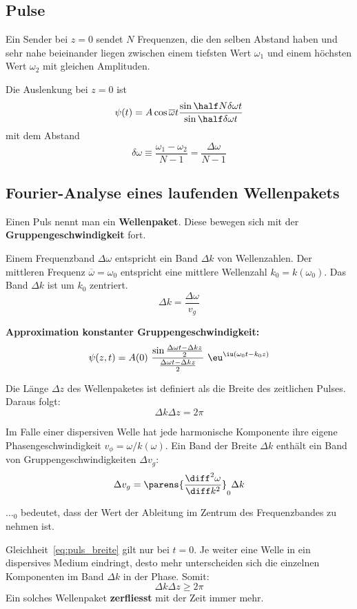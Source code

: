	\subsection{Pulse} %
		Ein Sender bei $z=0$ sendet $N$ Frequenzen, die den selben Abstand haben und sehr nahe beieinander liegen zwischen einem tiefsten Wert $\omega_1$ und einem höchsten Wert $\omega_2$ mit gleichen Amplituden.
		
		Die Auslenkung bei $z=0$ ist
		\[
			\psi(t) = A \cos \overline\omega t \frac{\sin \half N\delta \omega t}{\sin \half \delta \omega t}
		\]
		mit dem Abstand
		\[
			\delta \omega \equiv \frac{\omega_1 - \omega_2}{N-1} = \frac{\Delta \omega}{N-1}
		\]
	\subsection{Fourier-Analyse eines laufenden Wellenpakets} %
		Einen Puls nennt man ein \textbf{Wellenpaket}. Diese bewegen sich mit der \textbf{Gruppengeschwindigkeit} fort.
		
		Einem Frequenzband $\Delta \omega$ entspricht ein Band $\Delta k$ von Wellenzahlen. Der mittleren Frequenz $\overline \omega = \omega_0$ entspricht eine mittlere Wellenzahl $k_0 = k(\omega_0)$. Das Band $\Delta k$ ist um $k_0$ zentriert.
		\[
			\Delta k = \frac{\Delta \omega}{v_g}
		\]
		
		\textbf{Approximation konstanter Gruppengeschwindigkeit:}
		\[
			\psi(z,t) = A(0) \ \frac{\sin \frac{\Delta\omega t - \Delta k z}{2}}{\frac{\Delta\omega t - \Delta k z}{2}} \ \eu^{\iu (\omega_0 t - k_0 z)}
		\]
		
		Die Länge $\Delta z$ des Wellenpaketes ist definiert als die Breite des zeitlichen Pulses. Daraus folgt:
		\begin{equation}\label{eq:puls_breite}
			\Delta k \Delta z = 2\pi
		\end{equation}
		
		Im Falle einer dispersiven Welle hat jede harmonische Komponente ihre eigene Phasengeschwindigkeit $v_\phi = \omega/k(\omega)$. Ein Band der Breite $\Delta k$ enthält ein Band von Gruppengeschwindigkeiten $\Delta v_g$:
		\[
			\Delta v_g = \parens{\frac{\diff^2 \omega}{\diff k^2}}_0 \Delta k
		\]
		
		$\dots_0$ bedeutet, dass der Wert der Ableitung im Zentrum des Frequenzbandes zu nehmen ist.
		
		Gleichheit~\eqref{eq:puls_breite} gilt nur bei $t=0$. Je weiter eine Welle in ein dispersives Medium eindringt, desto mehr unterscheiden sich die einzelnen Komponenten im Band $\Delta k$ in der Phase. Somit:
		\[
			\Delta k \Delta z \ge 2\pi
		\]
		Ein solches Wellenpaket \textbf{zerfliesst} mit der Zeit immer mehr.
